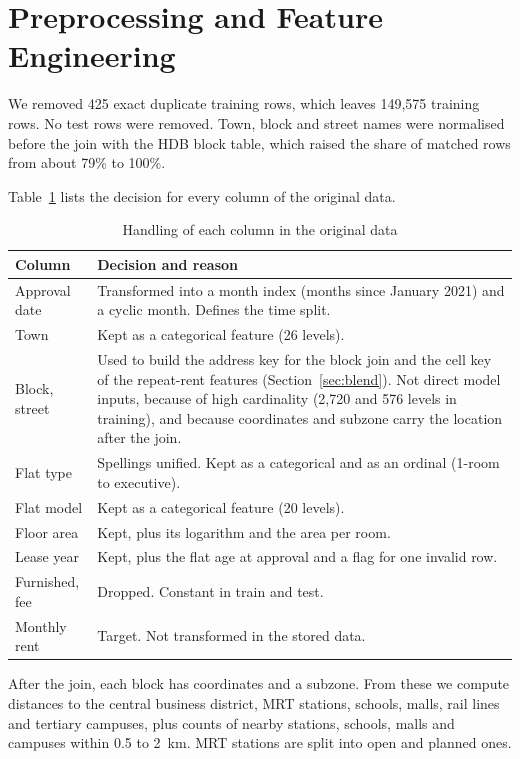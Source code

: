 \section{Preprocessing and Feature Engineering}\label{sec:preprocessing}

We removed 425 exact duplicate training rows, which leaves 149{,}575 training rows. No test rows were removed. Town, block and street names were normalised before the join with the HDB block table, which raised the share of matched rows from about 79\% to 100\%.

Table~\ref{tab:feature-handling} lists the decision for every column of the original data.

\begin{table}[htbp]
\caption{Handling of each column in the original data}
\label{tab:feature-handling}
\centering
\footnotesize
\begin{tabular}{p{}p{}}
\hline
\textbf{Column} & \textbf{Decision and reason} \\
\hline
Approval date & Transformed into a month index (months since January 2021) and a cyclic month. Defines the time split. \\
Town & Kept as a categorical feature (26 levels). \\
Block, street & Used to build the address key for the block join and the cell key of the repeat-rent features (Section~\ref{sec:blend}). Not direct model inputs, because of high cardinality (2{,}720 and 576 levels in training), and because coordinates and subzone carry the location after the join. \\
Flat type & Spellings unified. Kept as a categorical and as an ordinal (1-room to executive). \\
Flat model & Kept as a categorical feature (20 levels). \\
Floor area & Kept, plus its logarithm and the area per room. \\
Lease year & Kept, plus the flat age at approval and a flag for one invalid row. \\
Furnished, fee & Dropped. Constant in train and test. \\
Monthly rent & Target. Not transformed in the stored data. \\
\hline
\end{tabular}
\end{table}

After the join, each block has coordinates and a subzone. From these we compute distances to the central business district, MRT stations, schools, malls, rail lines and tertiary campuses, plus counts of nearby stations, schools, malls and campuses within 0.5 to 2~km. MRT stations are split into open and planned ones.

